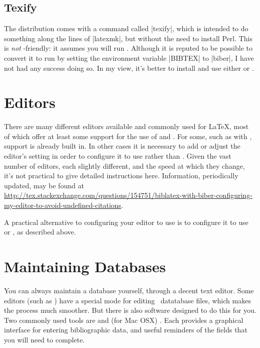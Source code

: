 \subsection{Texify}

The  distribution comes with a command called
|texify|, which is intended to do something along the lines of
|latexmk|, but without the need to install Perl. This is \emph{not}
-friendly: it assumes you will run \bibtex. Although it
is reputed to be possible to convert it to run  by
setting the environment variable |BIBTEX| to |biber|, I have not had
any success doing so. In my view, it's better to install and use
either  or .

\section{Editors}

There are many different editors available and commonly used for
\LaTeX, most of which offer at least some support for the use of
 and \biblatex. For some, such as
 with , support is already built
in. In other cases it is necessary to add or adjust the editor's
setting in order to configure it to use  rather than
\bibtex. Given the vast number of editors, each slightly different,
and the speed at which they change, it's not practical to give
detailed instructions here. Information, periodically updated, may be
found at
\url{http://tex.stackexchange.com/questions/154751/biblatex-with-biber-configuring-my-editor-to-avoid-undefined-citations}.

A practical alternative to configuring your editor to use
 is to configure it to use  or
, as described above.

\section{Maintaining Databases}

You can always maintain a database yourself, through a decent text
editor. Some editors (such as ) have a special mode for editing
\bibtex\ datatabase files, which makes the process much smoother. But
there is also software designed to do this for you. Two commonly used
tools are  and (for Mac OSX) . Each
provides a graphical interface for entering bibliographic data, and
useful reminders of the fields that you will need to complete.

